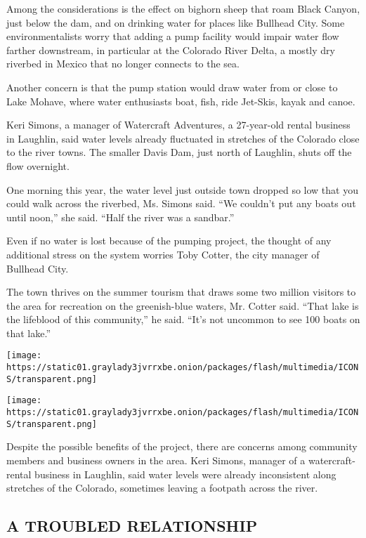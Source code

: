 Among the considerations is the effect on bighorn sheep that roam Black
Canyon, just below the dam, and on drinking water for places like
Bullhead City. Some environmentalists worry that adding a pump facility
would impair water flow farther downstream, in particular at the
Colorado River Delta, a mostly dry riverbed in Mexico that no longer
connects to the sea.

Another concern is that the pump station would draw water from or close
to Lake Mohave, where water enthusiasts boat, fish, ride Jet-Skis, kayak
and canoe.

Keri Simons, a manager of Watercraft Adventures, a 27-year-old rental
business in Laughlin, said water levels already fluctuated in stretches
of the Colorado close to the river towns. The smaller Davis Dam, just
north of Laughlin, shuts off the flow overnight.

One morning this year, the water level just outside town dropped so low
that you could walk across the riverbed, Ms. Simons said. ``We couldn't
put any boats out until noon,'' she said. ``Half the river was a
sandbar.''

Even if no water is lost because of the pumping project, the thought of
any additional stress on the system worries Toby Cotter, the city
manager of Bullhead City.

The town thrives on the summer tourism that draws some two million
visitors to the area for recreation on the greenish-blue waters, Mr.
Cotter said. ``That lake is the lifeblood of this community,'' he said.
``It's not uncommon to see 100 boats on that lake.''

\texttt{[image: https://static01.graylady3jvrrxbe.onion/packages/flash/multimedia/ICONS/transparent.png]}

\texttt{[image: https://static01.graylady3jvrrxbe.onion/packages/flash/multimedia/ICONS/transparent.png]}

Despite the possible benefits of the project, there are concerns among
community members and business owners in the area. Keri Simons, manager
of a watercraft-rental business in Laughlin, said water levels were
already inconsistent along stretches of the Colorado, sometimes leaving
a footpath across the river.

\hypertarget{a-troubled-relationship}{%
\subsection{A TROUBLED RELATIONSHIP}\label{a-troubled-relationship}}

